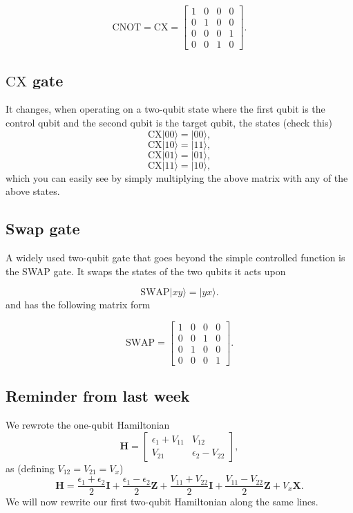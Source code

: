 \documentclass[%
oneside,                 %
final,                   %
10pt]{article}
\begin{document}
\[
\mathrm{CNOT}=\mathrm{CX}=\begin{bmatrix}
1 & 0 & 0 & 0 \\
0 & 1 & 0 & 0 \\
0 & 0 & 0 & 1 \\
0 & 0 & 1 & 0
\end{bmatrix}.
\]

\subsection{$\mathrm{CX}$ gate}

It changes, when operating on a two-qubit state where the first qubit is the control qubit and the second qubit is the target qubit, the states (check this)
\[
\mathrm{CX}\vert 00\rangle=\vert 00\rangle,
\]
\[
\mathrm{CX}\vert 10\rangle= \vert 11\rangle,
\]
\[
\mathrm{CX}\vert 01\rangle= \vert 01\rangle,
\]
\[
\mathrm{CX}\vert 11\rangle= \vert 10\rangle,
\]
which you can easily see by simply multiplying the above matrix with any of the above states.

\subsection{Swap gate}

A widely used two-qubit gate that goes beyond the simple controlled function is the SWAP gate. It swaps the states of the two qubits it acts upon

\[
\mathrm{SWAP}\vert xy\rangle=\vert yx\rangle.
\]
and has the following matrix form

\[
\mathrm{SWAP}
=\begin{bmatrix}
1 & 0 & 0 & 0 \\
0 & 0 & 1 & 0 \\
0 & 1 & 0 & 0 \\
0 & 0 & 0 & 1
\end{bmatrix}.
\]

\subsection{Reminder from last week}

We rewrote the one-qubit Hamiltonian
\[
\bm{H}=\begin{bmatrix} \epsilon_{1}+V_{11} & V_{12}\\
                       V_{21}  & \epsilon_{2}-V_{22} \end{bmatrix},
\] 
as (defining $V_{12}=V_{21}=V_x$) 
\[
\bm{H}=\frac{\epsilon_{1}+\epsilon_{2}}{2}\bm{I}+\frac{\epsilon_{1}-\epsilon_{2}}{2}\bm{Z}+\frac{V_{11}+V_{22}}{2}\bm{I}+\frac{V_{11}-V_{22}}{2}\bm{Z}+V_x\bm{X}.
\] 
We will now rewrite our first two-qubit Hamiltonian along the same lines.
\end{document}
